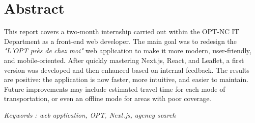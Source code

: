 \documentclass[12pt,a4paper]{report}
\begin{document}
\section*{Abstract}
This report covers a two-month internship carried out within the OPT-NC IT Department as a front-end web developer.  
The main goal was to redesign the \textit{"L’OPT près de chez moi"} web application to make it more modern, user-friendly, and mobile-oriented.  
After quickly mastering Next.js, React, and Leaflet, a first version was developed and then enhanced based on internal feedback.  
The results are positive: the application is now faster, more intuitive, and easier to maintain.  
Future improvements may include estimated travel time for each mode of transportation, or even an offline mode for areas with poor coverage.

\vspace{1cm}
\textit{Keywords : web application, OPT, Next.js, agency search}
\end{document}
